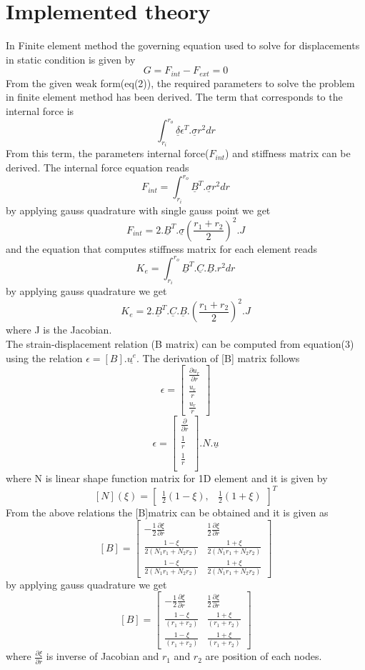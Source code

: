 \documentclass[a4paper,12pt]{article}
\begin{document}
\section*{Implemented theory}
In Finite element method the governing equation used to solve for displacements in static condition is given by 
$$  
G=F_{int} - F_{ext} = 0
$$
From the given weak form(eq(2)), the required parameters to solve the problem in finite element method has been derived. The term that corresponds to the internal force is $$ \int_{r_i}^{r_o} \underline{\delta}\epsilon^T .\underline{\sigma}  r^2 dr$$
 From this term, the parameters internal force($F_{int}$) and stiffness matrix can be derived. The internal force equation reads
 $$F_{int}= \int_{r_i}^{r_o} \underline{B}^T . \underline{\sigma} r^2 dr$$ by applying gauss quadrature with single gauss point we get 
$$  
F_{int} = 2.\underline{B}^T.\underline{\sigma}(\frac{r_1+r_2}{2})^2.J
$$
and the equation that computes stiffness matrix for each element reads $$K_e = \int_{r_i}^{r_o} \underline{B}^T.\underline{C}.\underline{B}.r^2 dr $$ by applying gauss quadrature we get 
$$  
K_e = 2.\underline{B}^T.\underline{C}.\underline{B}.(\frac{r_1+r_2}{2})^2.J
$$
where J is the Jacobian.\\
The strain-displacement relation (B matrix) can be computed from equation(3) using the relation $ \epsilon = [B].\underline{u^e} $. The derivation of [B] matrix follows
$$  
\epsilon = \begin{bmatrix}
\frac{\partial u_r }{\partial r}\\
\frac{u_r}{r}\\
\frac{u_r}{r}
\end{bmatrix}
$$
$$  
\epsilon = \begin{bmatrix}
\frac{\partial }{\partial r}\\
\frac{1}{r}\\
\frac{1}{r}\\
\end{bmatrix}. N .\underline{u}
$$
where N is linear shape function matrix for 1D element and it is given by $$ [N](\xi) = \begin{bmatrix}
\frac{1}{2}(1-\xi),& \frac{1}{2}(1+\xi)
\end{bmatrix}^T $$
From the above relations the [B]matrix can be obtained and it is given as 
$$  
[B] = \begin{bmatrix}
-\frac{1}{2}\frac{\partial \xi}{\partial r}&\frac{1}{2}\frac{\partial \xi}{\partial r}\\

\frac{1-\xi}{2(N_1r_1+N_2r_2)}&\frac{1+\xi}{2(N_1r_1+N_2r_2)}\\
\frac{1-\xi}{2(N_1r_1+N_2r_2)}&\frac{1+\xi}{2(N_1r_1+N_2r_2)}
\end{bmatrix}
$$
by applying gauss quadrature we get
$$  
[B] = \begin{bmatrix}
-\frac{1}{2}\frac{\partial \xi}{\partial r}&\frac{1}{2}\frac{\partial \xi}{\partial r}\\
\frac{1-\xi}{(r_1+r_2)}&\frac{1+\xi}{(r_1+r_2)}\\
\frac{1-\xi}{(r_1+r_2)}&\frac{1+\xi}{(r_1+r_2)}
\end{bmatrix}
$$
where $\frac{\partial \xi}{\partial r}$ is inverse of Jacobian and $r_1$  and $r_2$ are position of each nodes.
\end{document}
